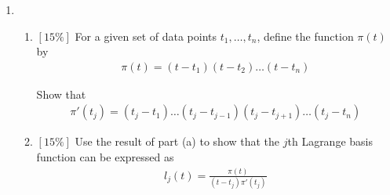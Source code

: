 \documentclass{article}
\begin{document}
\begin{enumerate}
\item
\begin{enumerate}
\item
$[15\%]$ For a given set of data points $t_1,\ldots,t_n$, define the function $\pi(t)$ by
\begin{eqnarray*}
\pi(t)=(t-t_1)(t-t_2)\ldots (t-t_n)
\end{eqnarray*}

Show that
\begin{eqnarray*}
\pi'(t_j)=(t_j-t_1)\ldots (t_j-t_{j-1})(t_j-t_{j+1})\ldots (t_j-t_n)
\end{eqnarray*}

\item
$[15\%]$ Use the result of part (a) to show that the $j$th Lagrange basis function can be
expressed as
\begin{eqnarray*}
l_j(t)=\frac{\pi(t)}{(t-t_j)\pi'(t_j)}
\end{eqnarray*}
\end{enumerate}
\end{enumerate}
\end{document}
